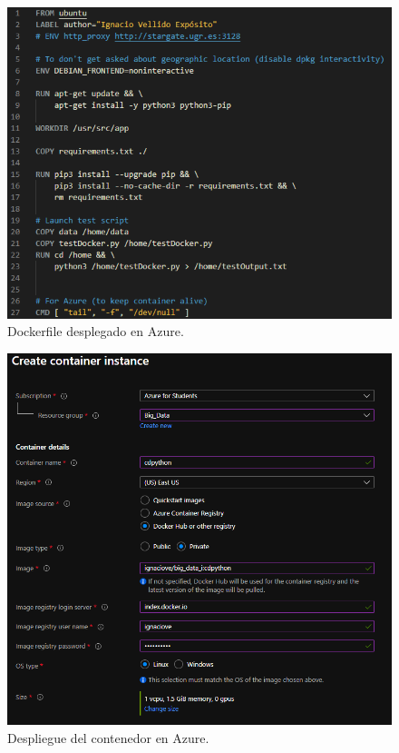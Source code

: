 \begin{figure}[H]\center\includegraphics[width=.95\linewidth]{img/python/p10.png}\caption{Dockerfile desplegado en Azure.}\end{figure}

\begin{figure}[H]\center\includegraphics[width=.85\linewidth]{img/python/p7.png}\caption{Despliegue del contenedor en Azure.}\end{figure}



